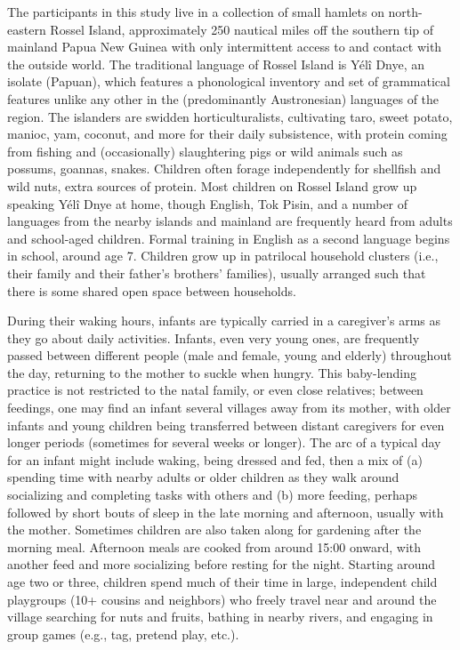 \documentclass[
  english,
  ,man,floatsintext]{apa6}
\begin{document}
The participants in this study live in a collection of small hamlets on north-eastern Rossel Island, approximately 250 nautical miles off the southern tip of mainland Papua New Guinea with only intermittent access to and contact with the outside world. The traditional language of Rossel Island is Yélî Dnye, an isolate (Papuan), which features a phonological inventory and set of grammatical features unlike any other in the (predominantly Austronesian) languages of the region. The islanders are swidden horticulturalists, cultivating taro, sweet potato, manioc, yam, coconut, and more for their daily subsistence, with protein coming from fishing and (occasionally) slaughtering pigs or wild animals such as possums, goannas, snakes. Children often forage independently for shellfish and wild nuts, extra sources of protein. Most children on Rossel Island grow up speaking Yélî Dnye at home, though English, Tok Pisin, and a number of languages from the nearby islands and mainland are frequently heard from adults and school-aged children. Formal training in English as a second language begins in school, around age 7. Children grow up in patrilocal household clusters (i.e., their family and their father's brothers' families), usually arranged such that there is some shared open space between households.

During their waking hours, infants are typically carried in a caregiver's arms as they go about daily activities. Infants, even very young ones, are frequently passed between different people (male and female, young and elderly) throughout the day, returning to the mother to suckle when hungry. This baby-lending practice is not restricted to the natal family, or even close relatives; between feedings, one may find an infant several villages away from its mother, with older infants and young children being transferred between distant caregivers for even longer periods (sometimes for several weeks or longer). The arc of a typical day for an infant might include waking, being dressed and fed, then a mix of (a) spending time with nearby adults or older children as they walk around socializing and completing tasks with others and (b) more feeding, perhaps followed by short bouts of sleep in the late morning and afternoon, usually with the mother. Sometimes children are also taken along for gardening after the morning meal. Afternoon meals are cooked from around 15:00 onward, with another feed and more socializing before resting for the night. Starting around age two or three, children spend much of their time in large, independent child playgroups (10+ cousins and neighbors) who freely travel near and around the village searching for nuts and fruits, bathing in nearby rivers, and engaging in group games (e.g., tag, pretend play, etc.).
\end{document}
